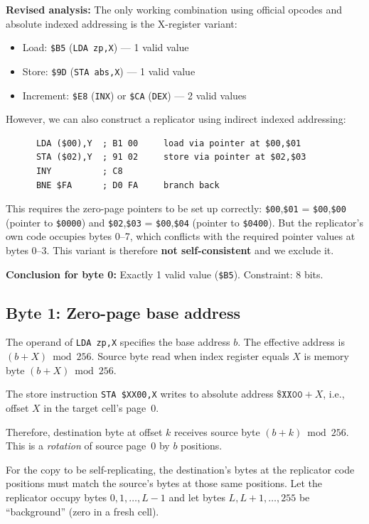 \documentclass{article}
\newcommand{\hex}[1]{\texttt{\$#1}}
\newcommand{\opcode}[1]{\texttt{#1}}
\begin{document}
\textbf{Revised analysis:} The only working combination using official
opcodes and absolute indexed addressing is the X-register variant:
\begin{itemize}
\item Load: \hex{B5} (\opcode{LDA zp,X}) --- 1 valid value
\item Store: \hex{9D} (\opcode{STA abs,X}) --- 1 valid value
\item Increment: \hex{E8} (\opcode{INX}) or \hex{CA} (\opcode{DEX}) --- 2 valid values
\end{itemize}

However, we can also construct a replicator using indirect indexed
addressing:

\begin{lstlisting}
      LDA ($00),Y  ; B1 00     load via pointer at $00,$01
      STA ($02),Y  ; 91 02     store via pointer at $02,$03
      INY          ; C8
      BNE $FA      ; D0 FA     branch back
\end{lstlisting}

This requires the zero-page pointers to be set up correctly:
\hex{00},\hex{01} = \hex{00},\hex{00} (pointer to \hex{0000}) and
\hex{02},\hex{03} = \hex{00},\hex{04} (pointer to \hex{0400}). But
the replicator's own code occupies bytes 0--7, which conflicts with
the required pointer values at bytes 0--3. This variant is therefore
\textbf{not self-consistent} and we exclude it.

\textbf{Conclusion for byte 0:} Exactly 1 valid value (\hex{B5}).
Constraint: 8 bits.

\subsection{Byte 1: Zero-page base address}

The operand of \opcode{LDA zp,X} specifies the base address $b$.
The effective address is $(b + X) \bmod 256$. Source byte read when
index register equals $X$ is memory byte $(b + X) \bmod 256$.

The store instruction \opcode{STA \$XX00,X} writes to absolute address
$\hex{XX00} + X$, i.e., offset $X$ in the target cell's page~0.

Therefore, destination byte at offset $k$ receives source byte
$(b + k) \bmod 256$. This is a \emph{rotation} of source page~0 by $b$
positions.

For the copy to be self-replicating, the destination's bytes at the
replicator code positions must match the source's bytes at those same
positions. Let the replicator occupy bytes $0, 1, \ldots, L-1$ and let
bytes $L, L+1, \ldots, 255$ be ``background'' (zero in a fresh cell).
\end{document}
